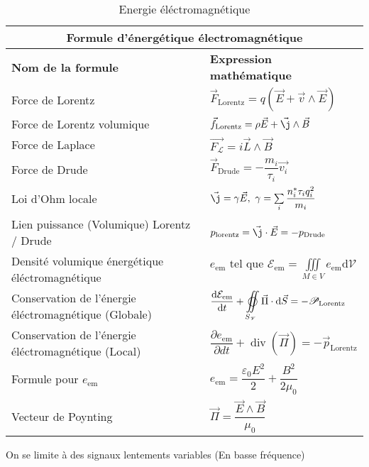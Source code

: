 \documentclass[10pt,a4paper,titlepage,portrait]{article}
\renewcommand{\d}
{
    \mathrm{d}
}
\newcommand*{\dv}[2]
{
    \dfrac{\d#1}{\d#2}
}
\newcommand*{\dpv}[2]
{
    \dfrac{\partial#1}{\partial#2}
}
\renewcommand{\div}
{
    \operatorname{div}
}
\renewcommand{\arraystretch}{2}
\begin{document}
\begin{center}
\begin{table}[ht]
    \centering
    \renewcommand{\arraystretch}{1.5} %
    \setlength{\tabcolsep}{8pt} %
    \begin{tabular}{@{}p{9cm}p{10cm}@{}}
        \toprule
        \multicolumn{2}{c}{\textbf{Formule d'énergétique électromagnétique}} \\
        \midrule
        \textbf{Nom de la formule} & \textbf{Expression mathématique} \\
        \midrule
    Force de Lorentz & $\vec{F}_{\text{Lorentz}} = q \left(\vec{E} + \vec{v} \wedge \vec{E}\right)$ \\ 
    Force de Lorentz volumique & $\vec{{f}}_{\text{Lorentz}} = \rho \vec{E} + \vec{\j}\wedge \vec{B}$ \\ 
    Force de Laplace & $\vec{F_\mathscr{L}}=i\vec{L}\wedge \vec{B}$ \\ 
    Force de Drude & $\vec{F}_{\text{Drude}} = -\dfrac{m_i}{\tau_i}\vec{v_i}$ \\ 
    Loi d'Ohm locale & $\vec{\j} = \gamma \vec{E}, \ \gamma = \sum\limits_{i}\dfrac{n_i^{*}\tau_i q_i^2}{m_i}$ \\ 
    Lien puissance (Volumique) Lorentz / Drude & $p_{\text{lorentz}} = \vec{\j}\cdot\vec{E} = -p_{\text{Drude}}$ \\ 
    Densité volumique énergétique éléctromagnétique & $\displaystyle e_{\text{em}} \text{ tel que } \mathcal{E}_{\text{em}} = \iiint\limits_{M\in V}e_{\text{em}} \text{d}\mathscr{V}$ \\ 
    Conservation de l'énergie éléctromagnétique (Globale) & $\displaystyle\dv{\mathcal{E}_{\text{em}}}{t} + \varoiint\limits_{S_{\mathscr{V}}} \vec{\Pi} \cdot \text{d} \vec{S} = -\mathscr{P}_{\text{Lorentz}}$ \\ 
    Conservation de l'énergie éléctromagnétique (Local) & $\displaystyle \dpv{e_{\text{em}}}{dt} + \div(\vec{\Pi}) = - \vec{p}_{\text{Lorentz}}$ \\ 
    Formule pour $e_{\text{em}}$ & $e_{\text{em}} = \dfrac{\varepsilon_0E^2}{2} + \dfrac{B^2}{2\mu_0}$ \\ 
    Vecteur de Poynting & $\vec{\Pi} = \dfrac{\vec{E} \wedge \vec{B}}{\mu_0}$ \\ 
    \bottomrule
\end{tabular}
\caption{Energie éléctromagnétique}
\label{tab:elec_energie}
\end{table}


On se limite à des signaux lentements variables (En basse fréquence)


\end{center}
\end{document}
